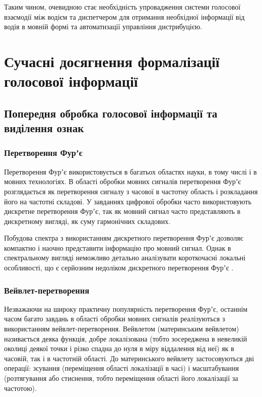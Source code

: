 Таким чином, очевидною стає необхідність упровадження системи голосової взаємодії між водієм та диспетчером для отримання необхідної інформації від водія в мовній формі та автоматизації управління дистрибуцією.

\section{Сучасні досягнення формалізації голосової інформації} \label{sect1_4}

\subsection{Попередня обробка голосової інформації та виділення ознак}

\subsubsection{Перетворення Фурʼє}

Перетворення Фурʼє використовується в багатьох областях науки, в тому числі і в мовних технологіях. В області обробки мовних сигналів перетворення Фурʼє розглядається як перетворення сигналу з часової в частотну область і розкладання його на частотні складові. У завданнях цифрової обробки часто використовують дискретне перетворення Фурʼє, так як мовний сигнал часто представляють в дискретному вигляді, як суму гармонічних складових.

Побудова спектра з використанням дискретного перетворення Фурʼє дозволяє компактно і наочно представити інформацію про мовний сигнал. Однак в спектральному вигляді неможливо детально аналізувати короткочасні локальні особливості, що є серйозним недоліком дискретного перетворення Фурʼє \cite{Сергиенко_2002}.

\subsubsection{Вейвлет-перетворення}

Незважаючи на широку практичну популярність перетворення Фурʼє, останнім часом багато завдань в області обробки мовних сигналів реалізуються з використанням вейвлет-перетворення. Вейвлетом (материнським вейвлетом) називається деяка функція, добре локалізована (тобто зосереджена в невеликій околиці деякої точки і різко спадна до нуля в міру віддалення від неї) як в часовій, так і в частотній області. До материнського вейвлету застосовуються дві операції: зсування (переміщення області локалізації в часі) і масштабування (розтягування або стиснення, тобто переміщення області його локалізації за частотою).

